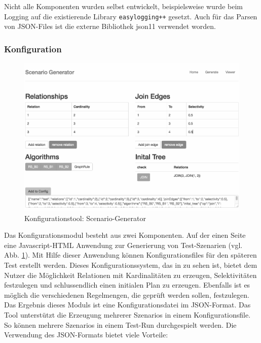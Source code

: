 Nicht alle Komponenten wurden selbst entwickelt, beispielsweise wurde beim Logging auf die existierende Library \texttt{easylogging++} gesetzt. Auch für das Parsen von JSON-Files ist die externe Bibliothek json11 verwendet worden.



\subsubsection{Konfiguration}


\begin{figure}[ht]
  \centering
  \includegraphics[width=1\textwidth]{04_Implementierung/00_media/Tool.png}
  \caption{Konfigurationstool: Scenario-Generator}
  \label{ScenarioGenerator}
\end{figure}

Das Konfigurationsmodul besteht aus zwei Komponenten. Auf der einen Seite eine Javascript-HTML Anwendung zur Generierung von Test-Szenarien (vgl. Abb. \ref{ScenarioGenerator}). Mit Hilfe dieser Anwendung können Konfigurationsfiles für den späteren Test erstellt werden. Dieses Konfigurationssystem, das in  zu sehen ist, bietet dem Nutzer die Möglichkeit Relationen mit Kardinalitäten zu erzeugen, Selektivitäten festzulegen und schlussendlich einen initialen Plan zu erzeugen. Ebenfalls ist es möglich die verschiedenen Regelmengen, die geprüft werden sollen, festzulegen.
Das Ergebnis dieses Moduls ist eine Konfigurationsdatei im JSON-Format. Das Tool unterstützt die Erzeugung mehrerer Szenarios in einem Konfigurationsfile. So können mehrere Szenarios in einem Test-Run durchgespielt werden. Die Verwendung des JSON-Formats bietet viele Vorteile:

